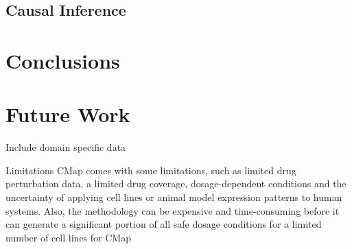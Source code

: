 \documentclass[bsc,frontabs,twoside,singlespacing,parskip,deptreport]{infthesis}     %
\let\Oldsection\section
\renewcommand{\section}{\FloatBarrier\Oldsection}
\begin{document}




\section{Causal Inference}

\chapter{Conclusions}

\chapter{Future Work}
Include domain specific data

Limitations
CMap comes with some limitations, such as limited drug perturbation data, a limited drug coverage, dosage-dependent conditions and the uncertainty of applying cell lines or animal model expression patterns to human systems. Also, the methodology can be expensive and time-consuming before it can generate a significant portion of all safe dosage conditions for a limited number of cell lines for CMap



\end{document}
